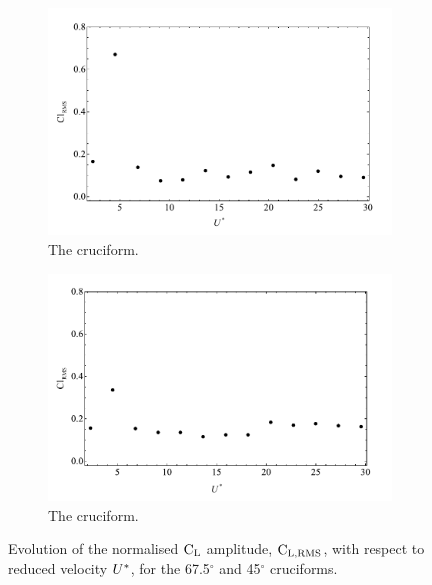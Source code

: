 \documentclass[oneside]{utmthesis}
\begin{document}
\begin{figure}
  \centering
  \begin{subfigure}[h]{1\textwidth}
    \includegraphics[width=\textwidth]{figs/clRMS4}
    \caption{The \angfo{} cruciform.}
    \label{fig:clRMS4}
  \end{subfigure}
  
  \begin{subfigure}[h]{1\textwidth}
    \includegraphics[width=\textwidth]{figs/clRMS3}
    \caption{The \angth{} cruciform.}
    \label{fig:clRMS3}
  \end{subfigure}

  \label{fig:clRMS43}
  \caption{Evolution of the normalised $\text{C}_{\text{L}}$ \rms{} amplitude, $\text{C}_{\text{L,RMS}}$, with respect to reduced velocity $U^{*}$, for the 67.5$^{\circ}$ and 45$^{\circ}$ cruciforms.}
\end{figure}
\end{document}
